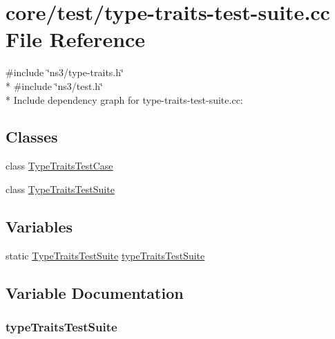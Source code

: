 \hypertarget{type-traits-test-suite_8cc}{}\section{core/test/type-\/traits-\/test-\/suite.cc File Reference}
\label{type-traits-test-suite_8cc}
{\ttfamily \#include \char`\"{}ns3/type-\/traits.\+h\char`\"{}}\\*
{\ttfamily \#include \char`\"{}ns3/test.\+h\char`\"{}}\\*
Include dependency graph for type-\/traits-\/test-\/suite.cc\+:
\subsection*{Classes}
\begin{DoxyCompactItemize}
\item 
class \hyperlink{classTypeTraitsTestCase}{Type\+Traits\+Test\+Case}
\item 
class \hyperlink{classTypeTraitsTestSuite}{Type\+Traits\+Test\+Suite}
\end{DoxyCompactItemize}
\subsection*{Variables}
\begin{DoxyCompactItemize}
\item 
static \hyperlink{classTypeTraitsTestSuite}{Type\+Traits\+Test\+Suite} \hyperlink{type-traits-test-suite_8cc_af796d27f8dbbac5ee1a068f9ebc57a12}{type\+Traits\+Test\+Suite}
\end{DoxyCompactItemize}


\subsection{Variable Documentation}
\subsubsection[{\texorpdfstring{type\+Traits\+Test\+Suite}{typeTraitsTestSuite}}]{ type\+Traits\+Test\+Suite\hspace{0.3cm}{\ttfamily [static]}}\hypertarget{type-traits-test-suite_8cc_af796d27f8dbbac5ee1a068f9ebc57a12}{}\label{type-traits-test-suite_8cc_af796d27f8dbbac5ee1a068f9ebc57a12}
